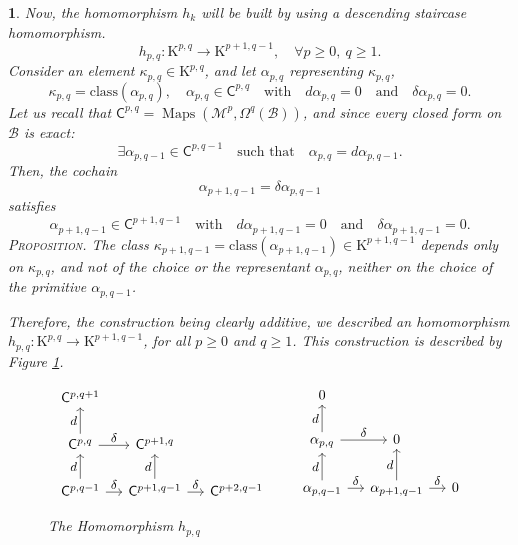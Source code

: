 \documentclass[12pt,reqno]{amsart}
\theoremstyle{article}
\newtheorem{article}{}
\def \K{\mathrm K}
\newcommand{\cB}{{\mathcal B}}
\newcommand{\cM}{\mathcal{M}}
\newcommand{\sC}{\mathsf{C}}
\newcommand{\class}{\mathrm{class}}
\DeclareMathOperator{\Maps}{Maps}
\begin{document}
\begin{article}
    Now,
    the homomorphism $h_k$ will be built by using a descending staircase homomorphism.
    $$
    h_{p,q} \colon \K^{p,q} \to \K^{p+1,q-1},
    \quad \forall p \geq 0, \ q \geq 1.
    $$
    Consider an element $\kappa_{p,q} \in \K^{p,q}$,
    and let $\alpha_{p,q}$ representing $\kappa_{p,q}$,
    $$
    \kappa_{p,q} = \class(\alpha_{p,q}), \quad \alpha_{p,q} \in \sC^{p,q}
    \quad \text{with}\quad
    d\alpha_{p,q} = 0
    \quad \text{and}\quad
    \delta\alpha_{p,q} = 0.
    $$
    Let us recall that $\sC^{p,q} = \Maps(\cM^p,\Omega^q(\cB))$,
    and since every closed form on $\cB$ is exact:
    $$
    \exists \alpha_{p,q-1} \in \sC^{p,q-1}
    \quad \text{such that}\quad
    \alpha_{p,q} = d \alpha_{p,q-1}.
    $$
    Then,
    the cochain
    $$
    \alpha_{p+1,q-1} = \delta\alpha_{p,q-1}
    $$
    satisfies
    $$
    \alpha_{p+1,q-1} \in \sC^{p+1,q-1}
    \quad \text{with}\quad
    d\alpha_{p+1,q-1} = 0
    \quad \text{and}\quad
    \delta\alpha_{p+1,q-1} = 0.
    $$
    \textsc{Proposition.} {\it The class $\kappa_{p+1,q-1} = \class(\alpha_{p+1,q-1}) \in \K^{p+1,q-1}$ depends only on $\kappa_{p,q}$,
    and not of the choice or the representant $\alpha_{p,q}$,
    neither on the choice of the primitive $\alpha_{p,q-1}$.}
    
    Therefore,
    the construction being clearly additive,
    we described an homomorphism $h_{p,q} \colon \K^{p,q} \to \K^{p+1,q-1}$,
    for all $p \geq 0$ and $q \geq 1$.
    This construction is described by Figure \ref{The-Homomorphism-h1}.
    
    \begin{figure}[thb]
      $$
      \begin{tikzcd}[column sep=small,every label/.append style = {font = \small}]
        \sC^{p,q+1}                                                   & \                                                   & \   \\
        \sC^{p,q} \arrow[u, "d"] \arrow[r, "\delta"]    & \sC^{p+1,q}                                     & \   \\
        \sC^{p,q-1} \arrow[u, "d"] \arrow[r, "\delta"]  & \sC^{p+1,q-1} \arrow[u, "d"] \arrow[r,"\delta"] & \sC^{p+2,q-1}
      \end{tikzcd}
      \quad \quad
      \begin{tikzcd}[column sep=small,every label/.append style = {font = \small}]
        0                                                  &                    \                               & \  \\
        \alpha_{p,q} \arrow[u, "d"] \arrow[r, "\delta"]  & 0                                                    & \  \\
        \alpha_{p,q-1} \arrow[u, "d"] \arrow[r, "\delta"]  & \alpha_{p+1,q-1} \arrow[u, "d"] \arrow[r,"\delta"] & 0
      \end{tikzcd}
      $$
      \vspace{-.5cm}
      \caption{The Homomorphism $h_{p,q}$}
      \label{The-Homomorphism-h1}
    \end{figure}
    

\end{article}
\end{document}
